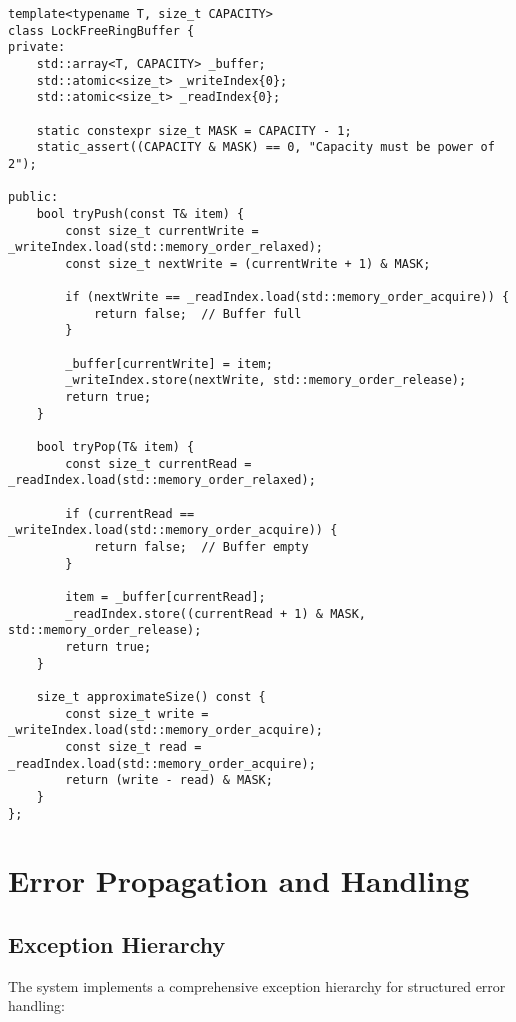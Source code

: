 \begin{lstlisting}[caption={Lock-Free Ring Buffer Implementation}, label={lst:lockfree_buffer}]
template<typename T, size_t CAPACITY>
class LockFreeRingBuffer {
private:
    std::array<T, CAPACITY> _buffer;
    std::atomic<size_t> _writeIndex{0};
    std::atomic<size_t> _readIndex{0};
    
    static constexpr size_t MASK = CAPACITY - 1;
    static_assert((CAPACITY & MASK) == 0, "Capacity must be power of 2");
    
public:
    bool tryPush(const T& item) {
        const size_t currentWrite = _writeIndex.load(std::memory_order_relaxed);
        const size_t nextWrite = (currentWrite + 1) & MASK;
        
        if (nextWrite == _readIndex.load(std::memory_order_acquire)) {
            return false;  // Buffer full
        }
        
        _buffer[currentWrite] = item;
        _writeIndex.store(nextWrite, std::memory_order_release);
        return true;
    }
    
    bool tryPop(T& item) {
        const size_t currentRead = _readIndex.load(std::memory_order_relaxed);
        
        if (currentRead == _writeIndex.load(std::memory_order_acquire)) {
            return false;  // Buffer empty
        }
        
        item = _buffer[currentRead];
        _readIndex.store((currentRead + 1) & MASK, std::memory_order_release);
        return true;
    }
    
    size_t approximateSize() const {
        const size_t write = _writeIndex.load(std::memory_order_acquire);
        const size_t read = _readIndex.load(std::memory_order_acquire);
        return (write - read) & MASK;
    }
};
\end{lstlisting}

\section{Error Propagation and Handling}
\label{sec:error_propagation}

\subsection{Exception Hierarchy}

The system implements a comprehensive exception hierarchy for structured error handling:

